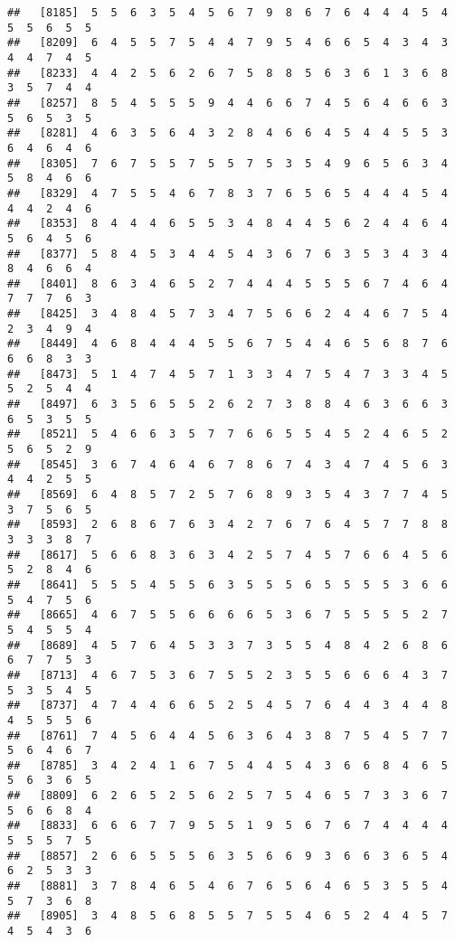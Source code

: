 \documentclass[
]{book}
\begin{document}
\begin{verbatim}
##   [8185]  5  5  6  3  5  4  5  6  7  9  8  6  7  6  4  4  4  5  4  5  5  6  5  5
##   [8209]  6  4  5  5  7  5  4  4  7  9  5  4  6  6  5  4  3  4  3  4  4  7  4  5
##   [8233]  4  4  2  5  6  2  6  7  5  8  8  5  6  3  6  1  3  6  8  3  5  7  4  4
##   [8257]  8  5  4  5  5  5  9  4  4  6  6  7  4  5  6  4  6  6  3  5  6  5  3  5
##   [8281]  4  6  3  5  6  4  3  2  8  4  6  6  4  5  4  4  5  5  3  6  4  6  4  6
##   [8305]  7  6  7  5  5  7  5  5  7  5  3  5  4  9  6  5  6  3  4  5  8  4  6  6
##   [8329]  4  7  5  5  4  6  7  8  3  7  6  5  6  5  4  4  4  5  4  4  4  2  4  6
##   [8353]  8  4  4  4  6  5  5  3  4  8  4  4  5  6  2  4  4  6  4  5  6  4  5  6
##   [8377]  5  8  4  5  3  4  4  5  4  3  6  7  6  3  5  3  4  3  4  8  4  6  6  4
##   [8401]  8  6  3  4  6  5  2  7  4  4  4  5  5  5  6  7  4  6  4  7  7  7  6  3
##   [8425]  3  4  8  4  5  7  3  4  7  5  6  6  2  4  4  6  7  5  4  2  3  4  9  4
##   [8449]  4  6  8  4  4  4  5  5  6  7  5  4  4  6  5  6  8  7  6  6  6  8  3  3
##   [8473]  5  1  4  7  4  5  7  1  3  3  4  7  5  4  7  3  3  4  5  5  2  5  4  4
##   [8497]  6  3  5  6  5  5  2  6  2  7  3  8  8  4  6  3  6  6  3  6  5  3  5  5
##   [8521]  5  4  6  6  3  5  7  7  6  6  5  5  4  5  2  4  6  5  2  5  6  5  2  9
##   [8545]  3  6  7  4  6  4  6  7  8  6  7  4  3  4  7  4  5  6  3  4  4  2  5  5
##   [8569]  6  4  8  5  7  2  5  7  6  8  9  3  5  4  3  7  7  4  5  3  7  5  6  5
##   [8593]  2  6  8  6  7  6  3  4  2  7  6  7  6  4  5  7  7  8  8  3  3  3  8  7
##   [8617]  5  6  6  8  3  6  3  4  2  5  7  4  5  7  6  6  4  5  6  5  2  8  4  6
##   [8641]  5  5  5  4  5  5  6  3  5  5  5  6  5  5  5  5  3  6  6  5  4  7  5  6
##   [8665]  4  6  7  5  5  6  6  6  6  5  3  6  7  5  5  5  5  2  7  5  4  5  5  4
##   [8689]  4  5  7  6  4  5  3  3  7  3  5  5  4  8  4  2  6  8  6  6  7  7  5  3
##   [8713]  4  6  7  5  3  6  7  5  5  2  3  5  5  6  6  6  4  3  7  5  3  5  4  5
##   [8737]  4  7  4  4  6  6  5  2  5  4  5  7  6  4  4  3  4  4  8  4  5  5  5  6
##   [8761]  7  4  5  6  4  4  5  6  3  6  4  3  8  7  5  4  5  7  7  5  6  4  6  7
##   [8785]  3  4  2  4  1  6  7  5  4  4  5  4  3  6  6  8  4  6  5  5  6  3  6  5
##   [8809]  6  2  6  5  2  5  6  2  5  7  5  4  6  5  7  3  3  6  7  5  6  6  8  4
##   [8833]  6  6  6  7  7  9  5  5  1  9  5  6  7  6  7  4  4  4  4  5  5  5  7  5
##   [8857]  2  6  6  5  5  5  6  3  5  6  6  9  3  6  6  3  6  5  4  6  2  5  3  3
##   [8881]  3  7  8  4  6  5  4  6  7  6  5  6  4  6  5  3  5  5  4  5  7  3  6  8
##   [8905]  3  4  8  5  6  8  5  5  7  5  5  4  6  5  2  4  4  5  7  4  5  4  3  6

\end{verbatim}
\end{document}
